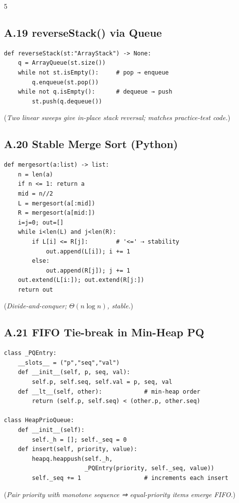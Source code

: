 \documentclass[6pt,landscape]{article}
\begin{document}
\begin{multicols}{5}
\subsection{A.19 reverseStack() via Queue}\label{code:A19}
\begin{verbatim}
def reverseStack(st:"ArrayStack") -> None:
    q = ArrayQueue(st.size())
    while not st.isEmpty():     # pop → enqueue
        q.enqueue(st.pop())
    while not q.isEmpty():      # dequeue → push
        st.push(q.dequeue())
\end{verbatim}
(\textit{Two linear sweeps give in-place stack reversal; matches practice-test code.})

\subsection{A.20 Stable Merge Sort (Python)}\label{code:A20}
\begin{verbatim}
def mergesort(a:list) -> list:
    n = len(a)
    if n <= 1: return a
    mid = n//2
    L = mergesort(a[:mid])
    R = mergesort(a[mid:])
    i=j=0; out=[]
    while i<len(L) and j<len(R):
        if L[i] <= R[j]:        # '<=' ⇢ stability
            out.append(L[i]); i += 1
        else:
            out.append(R[j]); j += 1
    out.extend(L[i:]); out.extend(R[j:])
    return out
\end{verbatim}
(\textit{Divide-and-conquer; $\Theta(n\log n)$, stable.})

\subsection{A.21 FIFO Tie-break in Min-Heap PQ}\label{code:A21}
\begin{verbatim}
class _PQEntry:
    __slots__ = ("p","seq","val")
    def __init__(self, p, seq, val):
        self.p, self.seq, self.val = p, seq, val
    def __lt__(self, other):            # min-heap order
        return (self.p, self.seq) < (other.p, other.seq)

class HeapPrioQueue:
    def __init__(self):
        self._h = []; self._seq = 0
    def insert(self, priority, value):
        heapq.heappush(self._h,
                       _PQEntry(priority, self._seq, value))
        self._seq += 1                  # increments each insert
\end{verbatim}
(\textit{Pair priority with monotone sequence ⇒ equal-priority items emerge FIFO.})


\end{multicols}
\end{document}
